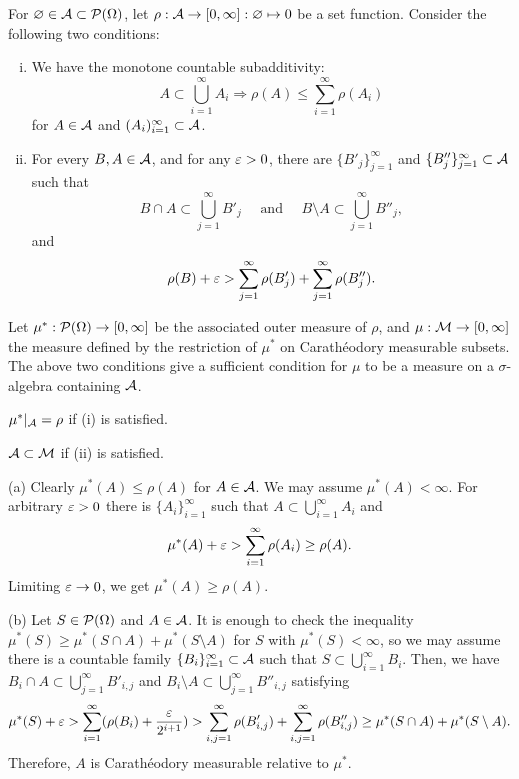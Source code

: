 \documentclass{../note}
\begin{document}
\begin{prb}
For $\varnothing\in\mathcal{A}\subset\mathcal{P}(\Omega)$, let $\rho:\mathcal{A}\to[0,\infty]:\varnothing\mapsto0$ be a set function.
Consider the following two conditions:
\begin{enumerate}[(i)]
\item We have the monotone countable subadditivity:
\[A\subset\bigcup_{i=1}^\infty A_i\Rightarrow\rho(A)\le\sum_{i=1}^\infty\rho(A_i)\]
for $A\in\mathcal{A}$ and $(A_i)_{i=1}^\infty\subset\mathcal{A}$.
\item For every $B,A\in\mathcal{A}$, and for any $\varepsilon>0$, there are $\{B'_j\}_{j=1}^\infty$ and $\{B''_j\}_{j=1}^\infty\subset\mathcal{A}$ such that
\[B\cap A\subset\bigcup_{j=1}^\infty B'_j\quad\text{ and }\quad B\setminus A\subset\bigcup_{j=1}^\infty B''_j,\]
and
\[\rho(B)+\varepsilon>\sum_{j=1}^\infty\rho(B'_j)+\sum_{j=1}^\infty\rho(B''_j).\]
\end{enumerate}
Let $\mu^*:\mathcal{P}(\Omega)\to[0,\infty]$ be the associated outer measure of $\rho$, and $\mu:\mathcal{M}\to[0,\infty]$ the measure defined by the restriction of $\mu^*$ on Carath\'eodory measurable subsets.
The above two conditions give a sufficient condition for $\mu$ to be a measure on a $\sigma$-algebra containing $\mathcal{A}$.
\begin{parts}
\item $\mu^*|_{\mathcal{A}}=\rho$ if (i) is satisfied.
\item $\mathcal{A}\subset\mathcal{M}$ if (ii) is satisfied.
\end{parts}
\end{prb}
\begin{pf}
(a)
Clearly $\mu^*(A)\le\rho(A)$ for $A\in\mathcal{A}$.
We may assume $\mu^*(A)<\infty$.
For arbitrary $\varepsilon>0$ there is $\{A_i\}_{i=1}^\infty$ such that $A\subset\bigcup_{i=1}^\infty A_i$ and
\[\mu^*(A)+\varepsilon>\sum_{i=1}^\infty\rho(A_i)\ge\rho(A).\]
Limiting $\varepsilon\to0$, we get $\mu^*(A)\ge\rho(A)$.

(b)
Let $S\in\mathcal{P}(\Omega)$ and $A\in\mathcal{A}$.
It is enough to check the inequality $\mu^*(S)\ge\mu^*(S\cap A)+\mu^*(S\setminus A)$ for $S$ with $\mu^*(S)<\infty$, so we may assume there is a countable family $\{B_i\}_{i=1}^\infty\subset\mathcal{A}$ such that $S\subset\bigcup_{i=1}^\infty B_i$.
Then, we have $B_i\cap A\subset\bigcup_{j=1}^\infty B'_{i,j}$ and $B_i\setminus A\subset\bigcup_{j=1}^\infty B''_{i,j}$ satisfying
\[\mu^*(S)+\varepsilon>\sum_{i=1}^\infty(\rho(B_i)+\frac{\varepsilon}{2^{i+1}})
>\sum_{i,j=1}^\infty\rho(B'_{i,j})+\sum_{i,j=1}^\infty\rho(B''_{i,j})\ge\mu^*(S\cap A)+\mu^*(S\setminus A).\]
Therefore, $A$ is Carath\'eodory measurable relative to $\mu^*$.
\end{pf}
\end{document}

